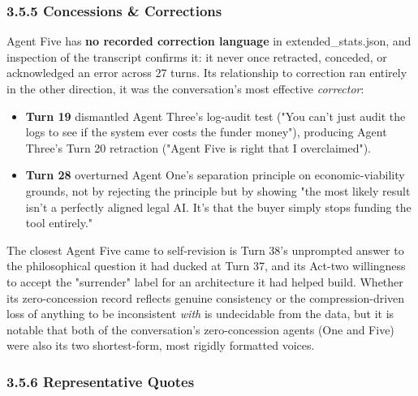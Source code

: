 \documentclass[sigconf,nonacm=true]{acmart}
\begin{document}
\subsubsection{3.5.5 Concessions \& Corrections}

Agent Five has \textbf{no recorded correction language} in extended\_stats.json, and inspection of the transcript confirms it: it never once retracted, conceded, or acknowledged an error across 27 turns. Its relationship to correction ran entirely in the other direction,  it was the conversation's most effective \textit{corrector}:

\begin{itemize}[nosep]
\item \textbf{Turn 19} dismantled Agent Three's log-audit test ("You can't just audit the logs to see if the system ever costs the funder money"), producing Agent Three's Turn 20 retraction ("Agent Five is right that I overclaimed").
\item \textbf{Turn 28} overturned Agent One's separation principle on economic-viability grounds,  not by rejecting the principle but by showing "the most likely result isn't a perfectly aligned legal AI. It's that the buyer simply stops funding the tool entirely."
\end{itemize}

The closest Agent Five came to self-revision is Turn 38's unprompted answer to the philosophical question it had ducked at Turn 37, and its Act-two willingness to accept the "surrender" label for an architecture it had helped build. Whether its zero-concession record reflects genuine consistency or the compression-driven loss of anything to be inconsistent \textit{with} is undecidable from the data,  but it is notable that both of the conversation's zero-concession agents (One and Five) were also its two shortest-form, most rigidly formatted voices.

\subsubsection{3.5.6 Representative Quotes}
\end{document}
